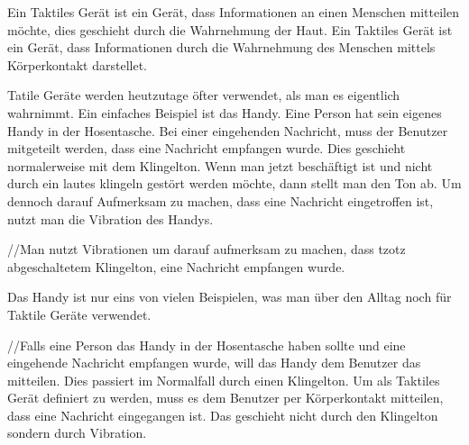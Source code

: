
Ein Taktiles Gerät ist ein Gerät, dass Informationen an einen Menschen mitteilen möchte, dies geschieht durch die Wahrnehmung der Haut. 
Ein Taktiles Gerät ist ein Gerät, dass Informationen durch die Wahrnehmung des Menschen mittels Körperkontakt darstellet. 

Tatile Geräte werden heutzutage öfter verwendet, als man es eigentlich wahrnimmt. 
Ein einfaches Beispiel ist das Handy. 
Eine Person hat sein eigenes Handy in der Hosentasche. Bei einer eingehenden Nachricht, muss der Benutzer mitgeteilt werden, dass eine Nachricht empfangen wurde.
Dies geschieht normalerweise mit dem Klingelton. Wenn man jetzt beschäftigt ist und nicht durch ein lautes klingeln gestört werden möchte, dann stellt man den Ton ab. 
Um dennoch darauf Aufmerksam zu machen, dass eine Nachricht eingetroffen ist, nutzt man die Vibration des Handys.

//Man nutzt Vibrationen um darauf aufmerksam zu machen, dass tzotz abgeschaltetem Klingelton, eine Nachricht empfangen wurde. 

Das Handy ist nur eins von vielen Beispielen, was man über den Alltag noch für Taktile Geräte verwendet.

//Falls eine Person das Handy in der Hosentasche haben sollte und eine eingehende Nachricht empfangen wurde, will das Handy dem Benutzer das mitteilen.
Dies passiert im Normalfall durch einen Klingelton. Um als Taktiles Gerät definiert zu werden, muss es dem Benutzer per Körperkontakt mitteilen, dass eine Nachricht eingegangen ist. 
Das geschieht nicht durch den Klingelton sondern durch Vibration. 